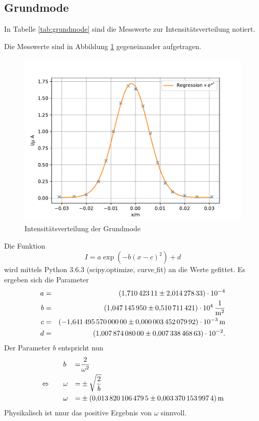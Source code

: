 \subsection{Grundmode}
In Tabelle \ref{tab:grundmode} sind die Messwerte zur Intensitätsverteilung notiert.

Die Messwerte sind in Abbildung \ref{fig:grundmode} gegeneinander aufgetragen.
\begin{figure}
  \centering
  \includegraphics[width=\textwidth]{grundmode.pdf}
  \caption{Intensitätsverteilung der Grundmode}
  \label{fig:grundmode}
\end{figure}
Die Funktion
\begin{equation*}
  I= a \exp{\left( -b(x-c)^2 \right)}+d
\end{equation*}
wird mittels Python 3.6.3 (scipy.optimize, curve$\_$fit) an die Werte gefittet.
Es ergeben sich die Parameter
\begin{align*}
a &=& \SI{ 1.71042311 \pm 2.01427833e-04  }{}\\
b &=& \SI{ 1.04714595 \pm 0.510711421  e+04}{\frac{1}{m^2}}\\
c &=& \SI{-1.64149557 \pm 0.00000345207992 e-03}{m}\\
d &=& \SI{ 1.00787408 \pm 0.00733846863 e-02}{}.\\
\end{align*}
Der Parameter $b$ entspricht nun
\begin{align*}
                  &&&&&      b &=&  \frac{2}{\omega^2} \\
  \Leftrightarrow &&&&& \omega &=& \pm \sqrt{\frac{2}{b}} \\
                  &&&&& \omega &=& \pm \SI{0.0138201064795 \pm 0.0033701539974}{m}\\
\end{align*}
Physikalisch ist nnur das positive Ergebnis von $\omega$ sinnvoll.

